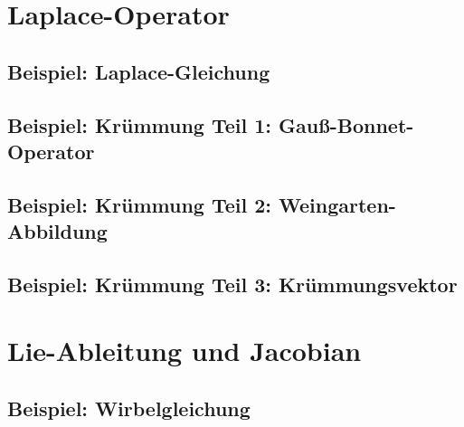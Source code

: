 \section{Laplace-Operator}

  \subsection{Beispiel: Laplace-Gleichung}

  \subsection{Beispiel: Krümmung Teil 1: Gauß-Bonnet-Operator}
  \subsection{Beispiel: Krümmung Teil 2: Weingarten-Abbildung}
  \subsection{Beispiel: Krümmung Teil 3: Krümmungsvektor}


\section{Lie-Ableitung und Jacobian}

  \subsection{Beispiel: Wirbelgleichung}


